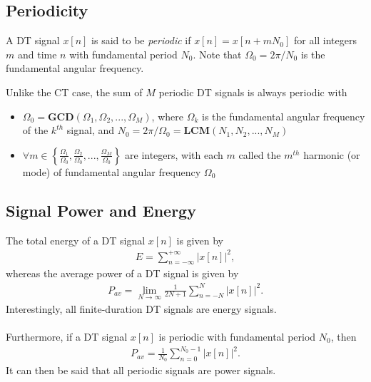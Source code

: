 \documentclass{report}
\begin{document}
\subsection{Periodicity}
A DT signal $x[n]$ is said to be \emph{periodic} if $x[n]=x[n+mN_0]$ for all integers $m$ and time $n$ with fundamental period $N_0$. 
Note that $\Omega_0=2\pi/N_0$ is the fundamental angular frequency.

\begin{tcolorbox}[width=\textwidth,colback={white}, sharp corners]
    Unlike the CT case, the sum of $M$ periodic DT signals is always periodic with 
    \begin{itemize}
        \item $\Omega_0=\mathbf{GCD}(\Omega_1,\Omega_2,...,\Omega_M)$, where $\Omega_k$ is the fundamental angular frequency of the $k^{th}$ signal, and 
        $N_0 = 2\pi/\Omega_0 = \mathbf{LCM}(N_1,N_2,...,N_M)$
        \item $\forall m\in\left\{\frac{\Omega_1}{\Omega_0}, \frac{\Omega_2}{\Omega_0}, ..., \frac{\Omega_M}{\Omega_0}\right\}$ are integers, 
        with each $m$ called the $m^{th}$ harmonic (or mode) of fundamental angular frequency $\Omega_0$
    \end{itemize}
\end{tcolorbox}


\subsection{Signal Power and Energy}
The total energy of a DT signal $x[n]$ is given by 
\begin{align}
    E = \sum_{n=-\infty}^{+\infty} |x[n]|^2,
\end{align}
whereas the average power of a DT signal is given by 
\begin{align}
    P_{av} = \lim_{N\rightarrow\infty}\frac{1}{2N+1}\sum_{n=-N}^{N} |x[n]|^2.
\end{align}
Interestingly, all finite-duration DT signals are energy signals.
\\ \\
Furthermore, if a DT signal $x[n]$ is periodic with fundamental period $N_0$, then
\begin{align}
    P_{av} = \frac{1}{N_0}\sum_{n=0}^{N_0-1}|x[n]|^2.
\end{align}
It can then be said that all periodic signals are power signals. 
\end{document}
